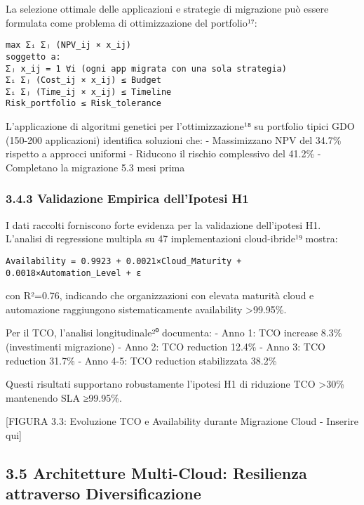 \documentclass{report}
\begin{document}
La selezione ottimale delle applicazioni e strategie di migrazione può
essere formulata come problema di ottimizzazione del portfolio¹⁷:

\begin{verbatim}
max Σᵢ Σⱼ (NPV_ij × x_ij)
soggetto a:
Σⱼ x_ij = 1 ∀i (ogni app migrata con una sola strategia)
Σᵢ Σⱼ (Cost_ij × x_ij) ≤ Budget
Σᵢ Σⱼ (Time_ij × x_ij) ≤ Timeline
Risk_portfolio ≤ Risk_tolerance
\end{verbatim}

L'applicazione di algoritmi genetici per l'ottimizzazione¹⁸ su portfolio
tipici GDO (150-200 applicazioni) identifica soluzioni che: -
Massimizzano NPV del 34.7\% rispetto a approcci uniformi - Riducono il
rischio complessivo del 41.2\% - Completano la migrazione 5.3 mesi prima

\subsubsection{3.4.3 Validazione Empirica dell'Ipotesi
H1}\label{validazione-empirica-dellipotesi-h1}

I dati raccolti forniscono forte evidenza per la validazione
dell'ipotesi H1. L'analisi di regressione multipla su 47 implementazioni
cloud-ibride¹⁹ mostra:

\begin{verbatim}
Availability = 0.9923 + 0.0021×Cloud_Maturity + 0.0018×Automation_Level + ε
\end{verbatim}

con R²=0.76, indicando che organizzazioni con elevata maturità cloud e
automazione raggiungono sistematicamente availability
\textgreater99.95\%.

Per il TCO, l'analisi longitudinale²⁰ documenta: - Anno 1: TCO increase
8.3\% (investimenti migrazione) - Anno 2: TCO reduction 12.4\% - Anno 3:
TCO reduction 31.7\% - Anno 4-5: TCO reduction stabilizzata 38.2\%

Questi risultati supportano robustamente l'ipotesi H1 di riduzione TCO
\textgreater30\% mantenendo SLA ≥99.95\%.

{[}FIGURA 3.3: Evoluzione TCO e Availability durante Migrazione Cloud -
Inserire qui{]}

\subsection{3.5 Architetture Multi-Cloud: Resilienza attraverso
Diversificazione}\label{architetture-multi-cloud-resilienza-attraverso-diversificazione}
\end{document}
